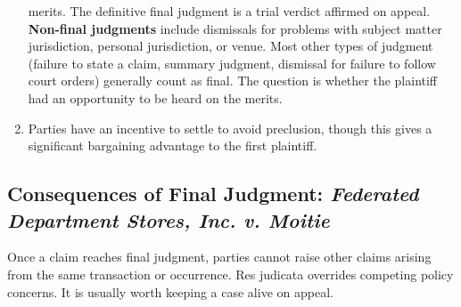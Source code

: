 \begin{enumerate}
    merits. The definitive final judgment is a trial verdict affirmed on 
    appeal. \textbf{Non-final judgments} include dismissals for problems with 
    subject matter jurisdiction, personal jurisdiction, or venue. Most other 
    types of judgment (failure to state a claim, summary judgment, dismissal 
    for failure to follow court orders) generally count as final. The question 
    is whether the plaintiff had an opportunity to be heard on the merits.
    \item Parties have an incentive to settle to avoid preclusion, though this 
    gives a significant bargaining advantage to the first plaintiff.
\end{enumerate}

\subsection{Consequences of Final Judgment: \emph{Federated Department Stores, 
Inc. v. Moitie}}

Once a claim reaches final judgment, parties cannot raise other claims arising 
from the same transaction or occurrence. Res judicata overrides competing 
policy concerns. It is usually worth keeping a case alive on appeal.


